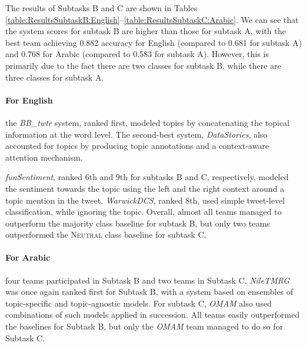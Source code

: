 \documentclass[11pt,a4paper]{article}
\begin{document}
The results of Subtasks B and C are shown in Tables \ref{table:ResultsSubtaskB:English}--\ref{table:ResultsSubtaskC:Arabic}. 
We can see that the system scores for subtask B are higher than those for subtask A, with the best team achieving 0.882 accuracy for English (compared to 0.681 for subtask A) and 0.768 for Arabic (compared to 0.583 for subtask A). However, this is primarily due to the fact there are two classes for subtask B, while there are three classes for subtask A.





\paragraph{For English} the \emph{BB\_twtr} system, ranked first, modeled topics by concatenating the topical information at the word level.
The second-best system, \emph{DataStories}, also accounted for topics by producing topic annotations and a context-aware attention mechanism. 




\noindent \emph{funSentiment}, ranked 6th and 9th for subtasks B and C, respectively, modeled the sentiment towards the topic using the left and the right context around a topic mention in the tweet. \emph{WarwickDCS}, ranked 8th, used simple tweet-level classification, while ignoring the topic. Overall, almost all teams managed to outperform the majority class baseline for subtask B, but only two teams outperformed the \textsc{Neutral} class baseline for subtask C.

\paragraph{For Arabic} four teams participated in Subtask B and two teams in Subtask C. \emph{NileTMRG} was once again ranked first for Subtask B, with a system based on ensembles of topic-specific and topic-agnostic models.
For subtask C, \emph{OMAM} also used combinations of such models applied in succession.  
All teams easily outperformed the baselines for Subtask B, but only the \emph{OMAM} team managed to do so for Subtask C.





\end{document}
